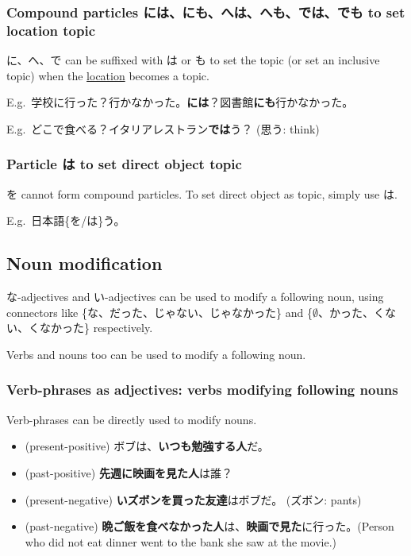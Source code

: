 \documentclass[../nihongo-gakushuu-kyouzai.tex]{subfiles}
\begin{document}
\subsubsection{Compound particles には、にも、へは、へも、では、でも to set location topic}
に、へ、で can be suffixed with は or も to set the topic (or set an inclusive topic) when the \ul{location} becomes a topic.

E.g.\ 学校に行った？行かなかった。\textbf{には}？図書館\textbf{にも}行かなかった。

E.g.\ どこで食べる？イタリアレストラン\textbf{では}う？ (思う: think)

\subsubsection{Particle は to set direct object topic}
を cannot form compound particles. To set direct object as topic, simply use は.

E.g.\ 日本語\{を/は\}う。

\subsection{Noun modification}
な-adjectives and い-adjectives can be used to modify a following noun, using connectors like \{な、だった、じゃない、じゃなかった\} and \{$\emptyset$、かった、くない、くなかった\} respectively.

Verbs and nouns too can be used to modify a following noun.

\subsubsection{Verb-phrases as adjectives: verbs modifying following nouns}
Verb-phrases can be directly used to modify nouns.
\begin{itemize}
    \item (present-positive) ボブは、\textbf{いつも勉強する人}だ。
    \item (past-positive) \textbf{先週に映画を見た人}は誰？
    \item (present-negative) \textbf{いズボンを買った友達}はボブだ。 (ズボン: pants)
    \item (past-negative) \textbf{晩ご飯を食べなかった人}は、\textbf{映画で見た}に行った。(Person who did not eat dinner went to the bank she saw at the movie.)
\end{itemize}
\end{document}
